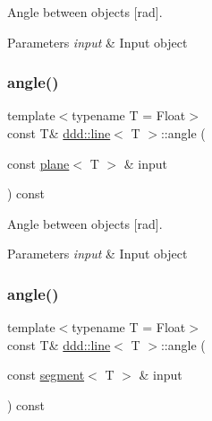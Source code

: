 Angle between objects \mbox{[}rad\mbox{]}. 


\begin{DoxyParams}{Parameters}
{\em input} & Input object \\
\hline
\end{DoxyParams}
\mbox{\label{classddd_1_1line_a3f7bf21d9f2338f9cc5538b6269ff603}} 
\subsubsection{\texorpdfstring{angle()}{angle()}\hspace{0.1cm}{\footnotesize\ttfamily [3/4]}}
{\footnotesize\ttfamily template$<$typename T = Float$>$ \\
const T\& \hyperlink{classddd_1_1line}{ddd\+::line}$<$ T $>$\+::angle (\begin{DoxyParamCaption}\item[{const \hyperlink{classddd_1_1plane}{plane}$<$ T $>$ \&}]{input }\end{DoxyParamCaption}) const\hspace{0.3cm}{\ttfamily [inline]}}



Angle between objects \mbox{[}rad\mbox{]}. 


\begin{DoxyParams}{Parameters}
{\em input} & Input object \\
\hline
\end{DoxyParams}
\mbox{\label{classddd_1_1line_a2dff36dabec19d440e5e8069cfe830df}} 
\subsubsection{\texorpdfstring{angle()}{angle()}\hspace{0.1cm}{\footnotesize\ttfamily [4/4]}}
{\footnotesize\ttfamily template$<$typename T = Float$>$ \\
const T\& \hyperlink{classddd_1_1line}{ddd\+::line}$<$ T $>$\+::angle (\begin{DoxyParamCaption}\item[{const \hyperlink{classddd_1_1segment}{segment}$<$ T $>$ \&}]{input }\end{DoxyParamCaption}) const\hspace{0.3cm}{\ttfamily [inline]}}



